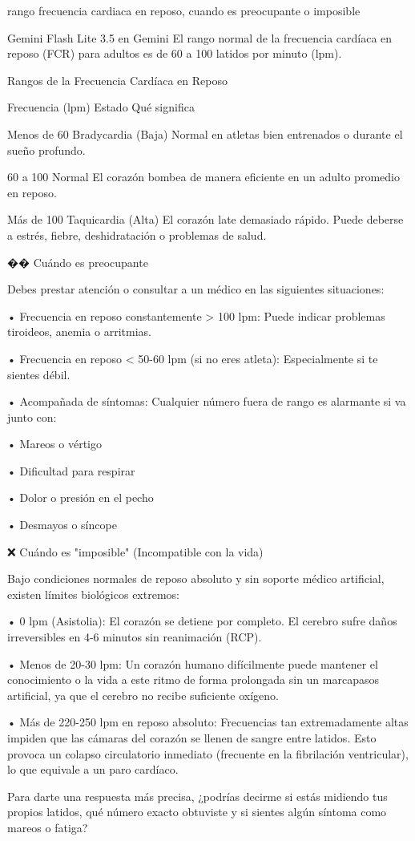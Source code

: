\documentclass[12pt,a4paper,oneside]{book}
\begin{document}
\begin{iaprompt}
rango frecuencia cardiaca en reposo, cuando es preocupante o imposible
\end{iaprompt}
\begin{iaresp} {Gemini Flash Lite 3.5 en Gemini}
El rango normal de la frecuencia cardíaca en reposo (FCR) para adultos es de 60 a 100 latidos por minuto (lpm).

Rangos de la Frecuencia Cardíaca en Reposo


Frecuencia (lpm)	Estado	Qué significa

Menos de 60	Bradycardia (Baja)	Normal en atletas bien entrenados o durante el sueño profundo.

60 a 100	Normal	El corazón bombea de manera eficiente en un adulto promedio en reposo.

Más de 100	Taquicardia (Alta)	El corazón late demasiado rápido. Puede deberse a estrés, fiebre, deshidratación o problemas de salud.


�� Cuándo es preocupante

Debes prestar atención o consultar a un médico en las siguientes situaciones:

• Frecuencia en reposo constantemente > 100 lpm: Puede indicar problemas tiroideos, anemia o arritmias.

• Frecuencia en reposo < 50-60 lpm (si no eres atleta): Especialmente si te sientes débil.

• Acompañada de síntomas: Cualquier número fuera de rango es alarmante si va junto con:

	• Mareos o vértigo
    
	• Dificultad para respirar
    
	• Dolor o presión en el pecho
    
	• Desmayos o síncope

❌ Cuándo es "imposible" (Incompatible con la vida)

Bajo condiciones normales de reposo absoluto y sin soporte médico artificial, existen límites biológicos extremos:

• 0 lpm (Asistolia): El corazón se detiene por completo. El cerebro sufre daños irreversibles en 4-6 minutos sin reanimación (RCP).

• Menos de 20-30 lpm: Un corazón humano difícilmente puede mantener el conocimiento o la vida a este ritmo de forma prolongada sin un marcapasos artificial, ya que el cerebro no recibe suficiente oxígeno.

• Más de 220-250 lpm en reposo absoluto: Frecuencias tan extremadamente altas impiden que las cámaras del corazón se llenen de sangre entre latidos. Esto provoca un colapso circulatorio inmediato (frecuente en la fibrilación ventricular), lo que equivale a un paro cardíaco.

Para darte una respuesta más precisa, ¿podrías decirme si estás midiendo tus propios latidos, qué número exacto obtuviste y si sientes algún síntoma como mareos o fatiga?

\end{iaresp}
\end{document}
